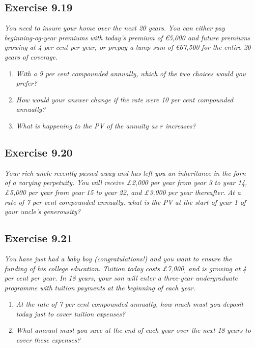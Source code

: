 \documentclass[]{book}
\newcommand{\euro}{€}
\theoremstyle{definition}
\theoremstyle{definition}
\theoremstyle{remark}
\begin{document}
\subsection{Exercise 9.19}\label{exercise-9.19}

\emph{You need to insure your home over the next 20 years. You can
either pay beginning-og-year premiums with today's premium of
\euro{}5,000 and future premiums growing at 4 per cent per year, or
prepay a lump sum of \euro{}67,500 for the entire 20 years of coverage.}
\citep[p.308]{book}

\begin{enumerate}
\def\labelenumi{\alph{enumi}.}
\item
  \emph{With a 9 per cent compounded annually, which of the two choices
  would you prefer?} \citep[p.308]{book}
\item
  \emph{How would your answer change if the rate were 10 per cent
  compounded annually?} \citep[p.308]{book}
\item
  \emph{What is happening to the PV of the annuity as \(r\) increases?}
  \citep[p.308]{book}
\end{enumerate}

\subsection{Exercise 9.20}\label{exercise-9.20}

\emph{Your rich uncle recently passed away and has left you an
inheritance in the forn of a varying perpetuity. You will receive £2,000
per year from year 3 to year 14, £5,000 per year from year 15 to year
22, and £3,000 per year thereafter. At a rate of 7 per cent compounded
annually, what is the PV at the start of year 1 of your uncle's
generousity?} \citep[p.308]{book}

\subsection{Exercise 9.21}\label{exercise-9.21}

\emph{You have just had a baby boy (congratulations!) and you want to
ensure the funding of his college education. Tuition today costs £7,000,
and is growing at 4 per cent per year. In 18 years, your son will enter
a three-year undergraduate programme with tuition payments at the
beginning of each year.} \citep[p.308]{book}

\begin{enumerate}
\def\labelenumi{\alph{enumi}.}
\item
  \emph{At the rate of 7 per cent compounded annually, how much must you
  deposit today just to cover tuition expenses?} \citep[p.308]{book}
\item
  \emph{What amount must you save at the end of each year over the next
  18 years to cover these expenses?} \citep[p.308]{book}
\end{enumerate}
\end{document}
